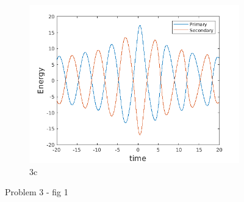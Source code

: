 \documentclass[a4paper]{article}
\begin{document}
\begin{figure} [h]
				\begin{subfigure} {\columnwidth}
					\centering
					\includegraphics[width=.5\columnwidth]{../plots/3c_energy.png}
					\caption{3c}
					\label{fig:3c}
				\end{subfigure}
				\caption{Problem 3 - fig 1}
				\label{fig:3.1}
			\end{figure}
			
\end{document}
